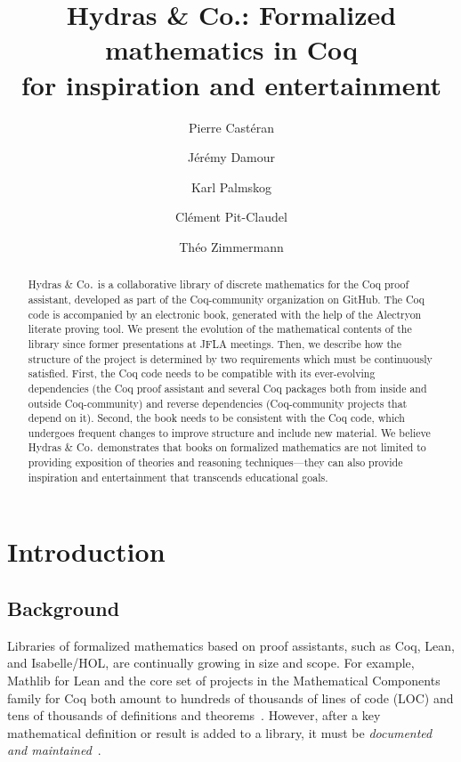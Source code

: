 \documentclass{easychair}
\title{Hydras \& Co.: Formalized mathematics in Coq\\
 for inspiration and entertainment
}
\author{
Pierre Castéran \inst{1}
\and
    Jérémy Damour \inst{2}
\and
Karl Palmskog \inst{3}
\and Clément Pit-Claudel \inst{4}
\and Théo Zimmermann \inst{5}
}
\institute{
Univ. Bordeaux, CNRS, Bordeaux INP, LaBRI, UMR 5800, F-33400 Talence, France  %
\and
Univ. de Paris, F-75013 Paris, France
\and
KTH Royal Institute of Technology, Stockholm, Sweden
\and
MIT CSAIL, Cambridge, Massachusetts, USA
\and
Inria, Univ. de Paris, CNRS, IRIF, UMR 8243, F-75013 Paris, France
}
\newcommand{\coq}{Coq\xspace}
\newcommand{\community}{Coq-community\xspace}
\newcommand{\alectr}{Alectryon\xspace}
\newcommand{\Hydras}{Hydras \& Co$\text.$\xspace}
\begin{document}
\maketitle


\begin{abstract}
  \Hydras is a collaborative library of discrete mathematics for the
  \coq proof assistant, developed as part of the \community organization
  on GitHub. The Coq code is accompanied
  by an electronic book, generated with the help of the \alectr
  literate proving tool. We present the evolution of the mathematical
  contents of the library since former presentations at JFLA meetings.
  Then, we describe how the structure of the project is determined
  by two requirements which must be continuously satisfied.
  First, the Coq code needs to be compatible with its ever-evolving
  dependencies (the Coq proof assistant and several Coq packages both from
  inside and outside \community) and reverse dependencies (\community
  projects that depend on it). Second, the book needs to be consistent
  with the Coq code, which undergoes frequent changes to improve
  structure and include new material. We believe \Hydras demonstrates
  that books on formalized mathematics are not limited to
  providing exposition of theories and reasoning techniques---they
  can also provide inspiration and entertainment that transcends educational goals.
\end{abstract}




\section{Introduction}
\label{sect:introduction}

\subsection{Background}

Libraries of formalized mathematics based on proof assistants, such as \coq, Lean, and Isabelle/HOL, are continually growing in size and scope.
For example, Mathlib for Lean and the core set of projects in the Mathematical Components family for Coq both amount to hundreds of thousands of lines of code (LOC) and tens of thousands of definitions and theorems~\cite{Nie2020a, Mathlib}. However, after a key mathematical definition or result is added to a library, it must be \emph{documented and maintained}~\cite{vanDoorn2020,alectryonpaper}.
\end{document}
